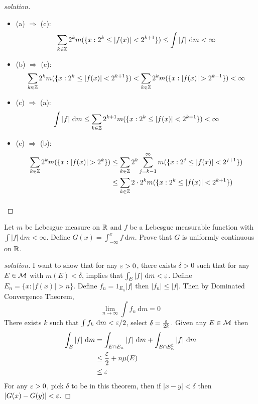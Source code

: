 \begin{proof}[solution]
  \begin{itemize}
    \item (a) $\Rightarrow$ (c): 
      \[\sum_{k \in \mathbb Z} 2^km(\{x : 2^k \le |f(x)| < 2^{k+1}\}) \le \int |f| \ \mathrm{d}m < \infty\]
    \item (b) $\Rightarrow$ (c): 
    \[\sum_{k \in \mathbb Z} 2^km(\{x : 2^k \le |f(x)| < 2^{k+1}\}) < \sum_{k \in \mathbb Z} 2^km(\{x : |f(x)| > 2^{k-1}\}) < \infty\]
    \item (c) $\Rightarrow$ (a): 
    \[\int |f| \ \mathrm{d}m \le \sum_{k\in \mathbb Z} 2^{k+1}m(\{x : 2^k \le |f(x)| < 2^{k+1}\}) < \infty\]
    \item (c) $\Rightarrow$ (b): 
    \begin{align*}
      \sum_{k \in \mathbb Z} 2^km(\{x : |f(x)| > 2^k\}) &\le \sum_{k \in \mathbb Z} 2^k \sum_{j=k-1}^\infty m(\{x : 2^j \le |f(x)| < 2^{j+1}\})\\
      &\le \sum_{k \in \mathbb Z} 2\cdot2^k m(\{x : 2^k \le |f(x)| < 2^{k+1}\})\\
    \end{align*}
    \[ \]
  \end{itemize}
\end{proof}

\begin{problem}
  Let $m$ be Lebesgue measure on $\mathbb R$ and $f$ be a Lebesgue measurable function with $\int |f|\ \mathrm{d}m < \infty$. 
  Define $G(x) = \int_{-\infty}^x f\ \mathrm{d}m$. Prove that $G$ is uniformly continuous on $\mathbb R$.
\end{problem}

\begin{proof}[solution]
  I want to show that for any $\varepsilon > 0$, there exists $\delta > 0$ such that for any $E \in \mathcal M$ with $m(E) < \delta$,
  implies that $\int_E |f|\ \mathrm{d}m < \varepsilon$. Define $E_n = \{x : |f(x)| > n\}$.
  Define $f_n = 1_{E_n}|f|$ then $|f_n| \le |f|$. Then by Dominated Convergence Theorem,
  \[\lim_{n\to\infty}\int f_n \ \mathrm{d}m = 0\]
  There exists $k$ such that $\int f_k \ \mathrm{d}m < \varepsilon/2$, select $\delta = \frac{\varepsilon}{2k}$.
  Given any $E \in \mathcal M$ then 
  \begin{align*}
    \int_E |f|\ \mathrm{d}m &= \int_{E \cap E_n} |f|\ \mathrm{d}m + \int_{E \cap E_n^\complement} |f|\ \mathrm{d}m\\
    &\le \frac{\varepsilon}2+ n\mu(E) \\
    &\le \varepsilon
  \end{align*}
  For any $\varepsilon > 0$, pick $\delta$ to be in this theorem, then 
  if $|x - y| < \delta$ then $|G(x) - G(y)| < \varepsilon$. 
\end{proof}

